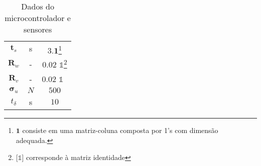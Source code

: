 \begin{table}[!ht]
\begin{minipage}[b]{0.45\linewidth}
\begin{tabular}{|c|c|c|}
                    $\mathbf{t}_s$ & s & $3.\mathbf{1}$\footnote{$\mathbf{1} $ consiste em uma matriz-coluna composta por 1's com dimensão adequada.} \\
                    $\mathbf{R}_w$ & - & 0.02 $\mathds{1}$\footnote{[$\mathds{1}$] corresponde à matriz identidade}  \\ 
                    $\mathbf{R}_v$ & - & 0.02 $\mathds{1}$ \, \\
                    $\mathbf{\sigma}_u$ & $N$ & $500$ \\
                    $t_{\delta}$ & s & $10$ \\
                    \hline
                \end{tabular}
                \caption{Dados do microcontrolador e sensores}
                \label{tab:dados_controle}
        \end{minipage}
    \end{table}